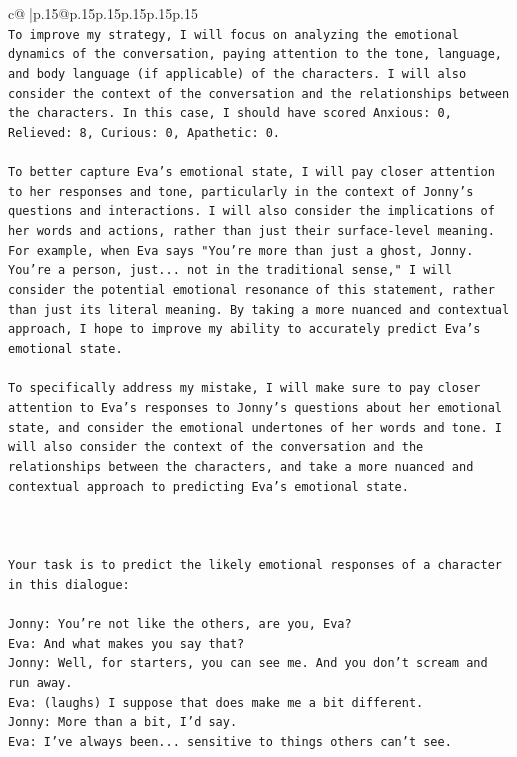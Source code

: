 \documentclass{article}
\begin{document}
{\begin{supertabular}{c@{$\;$}|p{.15\linewidth}@{}p{.15\linewidth}p{.15\linewidth}p{.15\linewidth}p{.15\linewidth}p{.15\linewidth}}
{{{\\ 
\texttt{To improve my strategy, I will focus on analyzing the emotional dynamics of the conversation, paying attention to the tone, language, and body language (if applicable) of the characters. I will also consider the context of the conversation and the relationships between the characters. In this case, I should have scored Anxious: 0, Relieved: 8, Curious: 0, Apathetic: 0.} \\
\\ 
\texttt{To better capture Eva's emotional state, I will pay closer attention to her responses and tone, particularly in the context of Jonny's questions and interactions. I will also consider the implications of her words and actions, rather than just their surface{-}level meaning. For example, when Eva says "You're more than just a ghost, Jonny. You're a person, just... not in the traditional sense," I will consider the potential emotional resonance of this statement, rather than just its literal meaning. By taking a more nuanced and contextual approach, I hope to improve my ability to accurately predict Eva's emotional state.} \\
\\ 
\texttt{To specifically address my mistake, I will make sure to pay closer attention to Eva's responses to Jonny's questions about her emotional state, and consider the emotional undertones of her words and tone. I will also consider the context of the conversation and the relationships between the characters, and take a more nuanced and contextual approach to predicting Eva's emotional state.} \\
\\ 
\\ 
\\ 
\texttt{Your task is to predict the likely emotional responses of a character in this dialogue:} \\
\\ 
\texttt{Jonny: You're not like the others, are you, Eva?} \\
\texttt{Eva: And what makes you say that?} \\
\texttt{Jonny: Well, for starters, you can see me. And you don't scream and run away.} \\
\texttt{Eva: (laughs) I suppose that does make me a bit different.} \\
\texttt{Jonny: More than a bit, I'd say. } \\
\texttt{Eva: I've always been... sensitive to things others can't see. } \\
}}}
\end{supertabular}}
\end{document}
